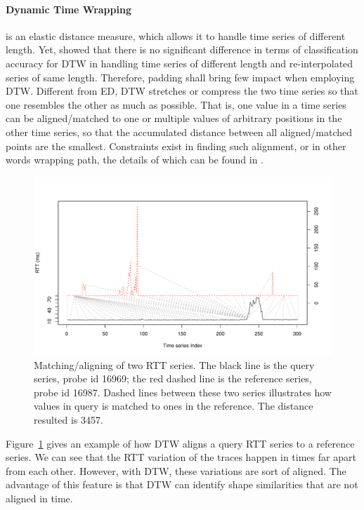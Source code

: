 \paragraph*{Dynamic Time Wrapping} is an elastic distance measure, which allows it to handle time series of different length. Yet, \cite{Ratanamahatana2005} showed that there is no significant difference in terms of classification accuracy for \ac{DTW} in handling time series of different length and re-interpolated series of same length. 
Therefore, padding shall bring few impact when employing \ac{DTW}.
Different from ED, \ac{DTW} stretches or compress the two time series so that one resembles the other as much as possible. That is, one value in a time series can be aligned/matched to one or multiple values of arbitrary positions in the other time series, so that the accumulated distance between all aligned/matched points are the smallest. Constraints exist in finding such alignment, or in other words wrapping path, the details of which can be found in \cite{Sakoe1978, Keogh2005, Giorgino2009}.

\begin{figure}[!htb]
\centering
\includegraphics[width=.8\textwidth]{gfx/chap3/dtw_ex.pdf}
\caption{Matching/aligning of two RTT series. The black line is the query series, probe id 16969; the red dashed line is the reference series, probe id 16987. Dashed lines between these two series illustrates how values in query is matched to ones in the reference. The distance resulted is 3457.}
\label{fig:dtw_ex}
\end{figure}

Figure~\ref{fig:dtw_ex} gives an example of how \ac{DTW} aligns a query RTT series to a reference series. We can see that the RTT variation of the traces happen in times far apart from each other. However, with \ac{DTW}, these variations are sort of aligned. The advantage of this feature is that \ac{DTW} can identify shape similarities that are not aligned in time.

